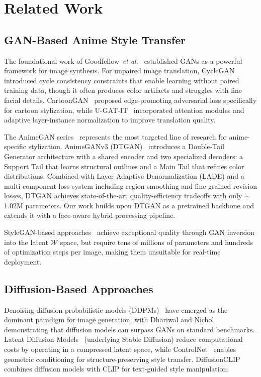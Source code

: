 \documentclass[journal]{IEEEtran}
\newcommand{\etal}{\textit{et al.}}
\begin{document}
\section{Related Work}
\label{sec:related}

\subsection{GAN-Based Anime Style Transfer}

The foundational work of Goodfellow~\etal~\cite{Goodfellow2014} established GANs as a powerful framework for image synthesis. For unpaired image translation, CycleGAN~\cite{Zhu2017} introduced cycle consistency constraints that enable learning without paired training data, though it often produces color artifacts and struggles with fine facial details. CartoonGAN~\cite{Chen2018CartoonGAN} proposed edge-promoting adversarial loss specifically for cartoon stylization, while U-GAT-IT~\cite{Kim2020} incorporated attention modules and adaptive layer-instance normalization to improve translation quality.

The AnimeGAN series~\cite{Chen2020, ChenLiu2020, Liu2024} represents the most targeted line of research for anime-specific stylization. AnimeGANv3 (DTGAN)~\cite{Liu2024} introduces a Double-Tail Generator architecture with a shared encoder and two specialized decoders: a Support Tail that learns structural outlines and a Main Tail that refines color distributions. Combined with Layer-Adaptive Denormalization (LADE) and a multi-component loss system including region smoothing and fine-grained revision losses, DTGAN achieves state-of-the-art quality-efficiency tradeoffs with only $\sim$1.02M parameters. Our work builds upon DTGAN as a pretrained backbone and extends it with a face-aware hybrid processing pipeline.

StyleGAN-based approaches~\cite{Karras2019, Richardson2021} achieve exceptional quality through GAN inversion into the latent $\mathcal{W}$ space, but require tens of millions of parameters and hundreds of optimization steps per image, making them unsuitable for real-time deployment.

\subsection{Diffusion-Based Approaches}

Denoising diffusion probabilistic models (DDPMs)~\cite{Ho2020} have emerged as the dominant paradigm for image generation, with Dhariwal and Nichol~\cite{Dhariwal2021} demonstrating that diffusion models can surpass GANs on standard benchmarks. Latent Diffusion Models~\cite{Rombach2022} (underlying Stable Diffusion) reduce computational costs by operating in a compressed latent space, while ControlNet~\cite{Zhang2023ControlNet} enables geometric conditioning for structure-preserving style transfer. DiffusionCLIP~\cite{Kim2022DiffusionCLIP} combines diffusion models with CLIP for text-guided style manipulation.
\end{document}
